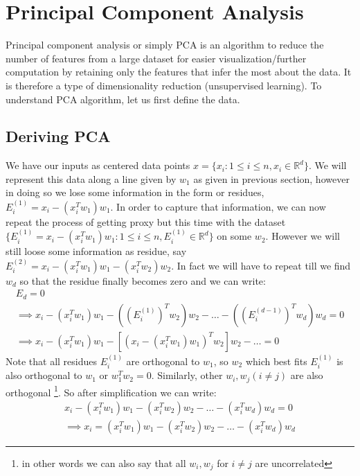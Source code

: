 \documentclass[12pt,a4paper]{article}
\begin{document}
\newpage
\section{Principal Component Analysis}
Principal component analysis or simply PCA is an algorithm to reduce the number of features from a large dataset for easier visualization/further computation by retaining only the features that infer the most about the data. It is therefore a type of dimensionality reduction (unsupervised learning). To understand PCA algorithm, let us first define the data.
\subsection{Deriving PCA} \label{Deriving PCA}
We have our inputs as centered data points $x = \{x_i : 1 \leq i \leq n, x_i \in \mathbb{R}^d\}$. We will represent this data along a line given by $w_1$ as given in previous section, however in doing so we lose some information in the form or residues, $E_i^{(1)} = x_i - (x_i^Tw_1)w_1$. In order to capture that information, we can now repeat the process of getting proxy but this time with the dataset $\{E_i^{(1)}=x_i - (x_i^Tw_1)w_1 : 1 \leq i \leq n, E_i^{(1)} \in \mathbb{R}^d\}$ on some $w_2$. However we will still loose some information as residue, say $E_i^{(2)} = x_i - (x_i^Tw_1)w_1 - (x_i^Tw_2)w_2$. In fact we will have to repeat till we find $w_d$ so that the residue finally becomes zero and we can write: 
\begin{gather*}
    E_d= 0\\
    \implies x_i - (x_i^Tw_1)w_1 - ((E_i^{(1)})^Tw_2)w_2 - \hdots - ((E_i^{(d-1)})^Tw_d)w_d = 0\\
    \implies x_i - (x_i^Tw_1)w_1 - [(x_i-(x_i^Tw_1)w_1)^Tw_2]w_2 - \hdots = 0
\end{gather*}
Note that all residues $E_i^{(1)}$ are orthogonal to $w_1$, so $w_2$ which best fits $E_i^{(1)}$ is also orthogonal to $w_1$ or $w_1^Tw_2=0$. Similarly, other $w_i, w_j (i \neq j)$ are also orthogonal \footnote{ \quad in other words we can also say that all $w_i, w_j$ for $i \neq j$ are uncorrelated}. So after simplification we can write: 
\begin{align}
    x_i - (x_i^Tw_1)w_1 - (x_i^Tw_2)w_2 - \hdots - (x_i^Tw_d)w_d = 0 \nonumber \\
    \implies x_i = (x_i^Tw_1)w_1 - (x_i^Tw_2)w_2 - \hdots - (x_i^Tw_d)w_d
\end{align}
\end{document}
